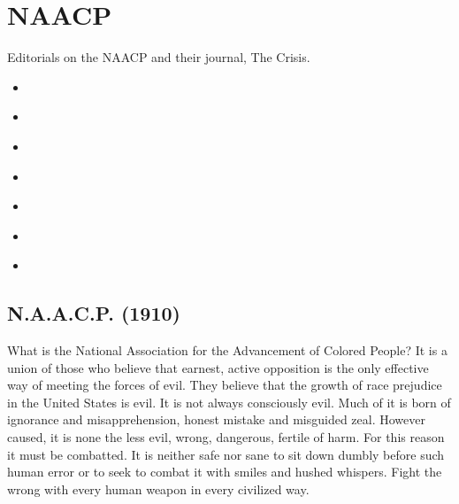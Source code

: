 \documentclass[letterpaper,10pt,english]{jupyterBook}
\begin{document}
\chapter{NAACP}
\label{\detokenize{Sections/NAACP:naacp}}\label{\detokenize{Sections/NAACP::doc}}
\sphinxAtStartPar
Editorials on the NAACP and their journal, The Crisis.
\begin{itemize}
\item {} 
\sphinxAtStartPar
{\hyperref[\detokenize{Volumes/01/02/NAACP::doc}]{}}

\item {} 
\sphinxAtStartPar
{\hyperref[\detokenize{Volumes/01/01/TheCrisis::doc}]{}}

\item {} 
\sphinxAtStartPar
{\hyperref[\detokenize{Volumes/06/01/vigilance_committee::doc}]{}}

\item {} 
\sphinxAtStartPar
{\hyperref[\detokenize{Volumes/07/03/fightordie::doc}]{}}

\item {} 
\sphinxAtStartPar
{\hyperref[\detokenize{Volumes/30/01/new_crisis::doc}]{}}

\item {} 
\sphinxAtStartPar
{\hyperref[\detokenize{Volumes/33/03/our_methods::doc}]{}}

\item {} 
\sphinxAtStartPar
{\hyperref[\detokenize{Volumes/40/01/toward_a_new_racial_philosophy::doc}]{}}

\end{itemize}


\section{N.A.A.C.P. (1910)}
\label{\detokenize{Volumes/01/02/NAACP:n-a-a-c-p-1910}}\label{\detokenize{Volumes/01/02/NAACP::doc}}
\sphinxAtStartPar
What is the National Association for the Advancement of Colored People? It is a union of those who believe that earnest, active opposition is the only effective way of meeting the forces of evil. They believe that the growth of race prejudice in the United States is evil. It is not always consciously evil. Much of it is born of ignorance and misapprehension, honest mistake and misguided zeal. However caused, it is none the less evil, wrong, dangerous, fertile of harm. For this reason it must be combatted. It is neither safe nor sane to sit down dumbly before such human error or to seek to combat it with smiles and hushed whispers. Fight the wrong with every human weapon in every civilized way.
\end{document}
